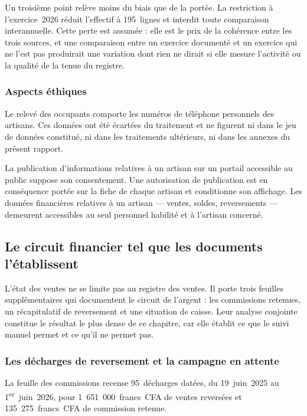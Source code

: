 Un troisième point relève moins du biais que de la portée. La restriction à l'exercice~2026 réduit l'effectif à 195~lignes et interdit toute comparaison interannuelle. Cette perte est assumée : elle est le prix de la cohérence entre les trois sources, et une comparaison entre un exercice documenté et un exercice qui ne l'est pas produirait une variation dont rien ne dirait si elle mesure l'activité ou la qualité de la tenue du registre.

\subsubsection{Aspects éthiques}

Le relevé des occupants comporte les numéros de téléphone personnels des artisans. Ces données ont été écartées du traitement et ne figurent ni dans le jeu de données constitué, ni dans les traitements ultérieurs, ni dans les annexes du présent rapport.

La publication d'informations relatives à un artisan sur un portail accessible au public suppose son consentement. Une autorisation de publication est en conséquence portée sur la fiche de chaque artisan et conditionne son affichage. Les données financières relatives à un artisan --- ventes, soldes, reversements --- demeurent accessibles au seul personnel habilité et à l'artisan concerné.

\subsection{Le circuit financier tel que les documents l'établissent}
\label{sec:2-2-5}

L'état des ventes ne se limite pas au registre des ventes. Il porte trois feuilles supplémentaires qui documentent le circuit de l'argent : les commissions retenues, un récapitulatif de reversement et une situation de caisse. Leur analyse conjointe constitue le résultat le plus dense de ce chapitre, car elle établit ce que le suivi manuel permet et ce qu'il ne permet pas.

\subsubsection{Les décharges de reversement et la campagne en attente}

La feuille des commissions recense 95~décharges datées, du 19~juin~2025 au 1\textsuperscript{er}~juin~2026, pour 1~651~000~francs~CFA de ventes reversées et 135~275~francs~CFA de commission retenue.

